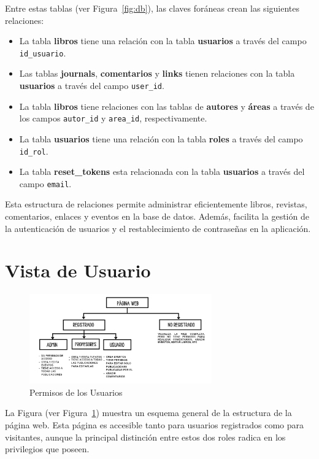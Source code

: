 \documentclass[a4paper, 12pt]{book}
\begin{document}
Entre estas tablas (ver Figura~\ref{fig:db}), las claves foráneas crean las siguientes relaciones:
  \begin{itemize}
  \item La tabla \textbf{libros} tiene una relación con la tabla \textbf{usuarios} a través del campo \texttt{id\_usuario}.
  \item Las tablas \textbf{journals}, \textbf{comentarios} y \textbf{links} tienen relaciones con la tabla \textbf{usuarios} a través del campo \texttt{user\_id}.
  \item La tabla \textbf{libros} tiene relaciones con las tablas de \textbf{autores} y \textbf{áreas} a través de los campos \texttt{autor\_id} y \texttt{area\_id}, respectivamente.
  \item La tabla \textbf{usuarios} tiene una relación con la tabla \textbf{roles} a través del campo \texttt{id\_rol}.
  \item La tabla \textbf{reset\_tokens} esta relacionada con la tabla \textbf{usuarios} a través del campo \texttt{email}.
  \end{itemize}

Esta estructura de relaciones permite administrar eficientemente libros, revistas, comentarios, enlaces y eventos en la 
base de datos. Además, facilita la gestión de la autenticación de usuarios y el restablecimiento de contraseñas en la aplicación.

\section{Vista de Usuario}
\label{sec:vista_usuarios}

\begin{figure}
  \centering
  \includegraphics[width=0.7\textwidth]{img/esquema.png}
  \caption{Permisos de los Usuarios}
  \label{fig:arquitectura}
\end{figure}

La Figura (ver Figura~\ref{fig:arquitectura}) muestra un esquema general de la estructura de la página web. Esta página es accesible tanto para usuarios registrados 
como para visitantes, aunque la principal distinción entre estos dos roles radica en los privilegios que poseen.
\end{document}
